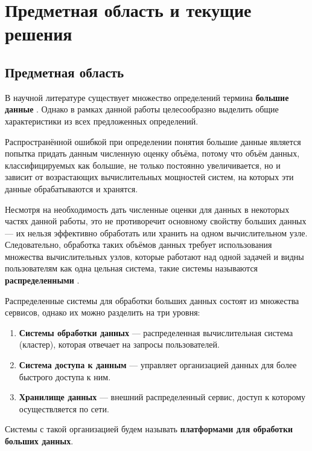 \section{Предметная область и текущие решения}
\subsection{Предметная область} \label{definition}

В научной литературе существует множество определений термина \textbf{большие данные} \cite{Bigdata_a_review, Bigdata_an_introduction, Challenges_of_big_data_analysis}. Однако в рамках данной работы целесообразно выделить общие характеристики из всех предложенных определений. 

Распространённой ошибкой при определении понятия большие данные является попытка придать данным численную оценку объёма, потому что объём данных, классифицируемых как большие, не только постоянно увеличивается, но и зависит от возрастающих вычислительных мощностей систем, на которых эти данные обрабатываются и хранятся. 

Несмотря на необходимость дать численные оценки для данных в некоторых частях данной работы, это не противоречит основному свойству больших данных --- их нельзя эффективно обработать или хранить на одном вычислительном узле. Следовательно, обработка таких объёмов данных требует использования множества вычислительных узлов, которые работают над одной задачей и видны пользователям как одна цельная система, такие системы называются \textbf{распределенными} \cite{Time_clocks_and_the_ordering_of_events_in_a_distributed_system}.

Распределенные системы для обработки больших данных состоят из множества сервисов, однако их можно разделить на три уровня: \cite{Spatial_big_data_architecture}
\begin{enumerate}
    \item \textbf{Системы обработки данных} --- распределенная вычислительная система (кластер), которая отвечает на запросы пользователей.
    \item \textbf{Система доступа к данным} --- управляет организацией данных для более быстрого доступа к ним.
    \item \textbf{Хранилище данных} --- внешний распределенный сервис, доступ к которому осуществляется по сети.
\end{enumerate}
Системы с такой организацией будем называть \textbf{платформами для обработки больших данных}.

